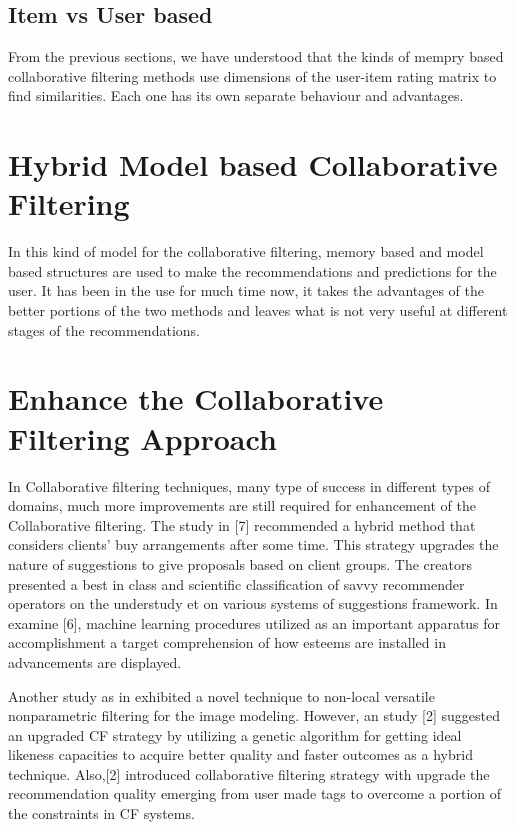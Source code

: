\documentclass[10pt,conference]{IEEEtran}
\begin{document}
\subsection{Item vs User based}
From the previous sections, we have understood that the kinds of mempry based collaborative filtering methods use dimensions of the user-item rating matrix to find similarities.
Each one has its own separate behaviour and advantages.


\section{Hybrid Model based Collaborative Filtering}
In this kind of model for the collaborative filtering, memory based and model based structures are used to make the recommendations and predictions for the user. It has been in the use for much time now, it takes the advantages of the better portions of the two methods and leaves what is not very useful at different stages of the recommendations.

\section{Enhance the Collaborative Filtering Approach}
In Collaborative filtering techniques, many type of success in different types of domains, much more improvements are still required for enhancement of the Collaborative filtering.
The study in [7] recommended a hybrid method that considers clients' buy arrangements after some time. This strategy upgrades the nature of suggestions to give proposals based on client groups. The creators presented a best in class and scientific classification of savvy recommender operators on the understudy et on various systems of suggestions framework. In examine [6], machine learning procedures utilized as an important apparatus for accomplishment a target comprehension of how esteems are installed in advancements are displayed. 

Another study as in \cite{ekstrand2011collaborative} exhibited a novel technique to non-local versatile nonparametric filtering for the image modeling. However, an study [2] suggested an upgraded CF strategy by utilizing a genetic algorithm for getting ideal likeness capacities to acquire better quality and faster outcomes as a hybrid technique. 
Also,[2] introduced collaborative filtering strategy with upgrade the recommendation quality emerging from user made tags to overcome a portion of the constraints in CF systems.
\end{document}
